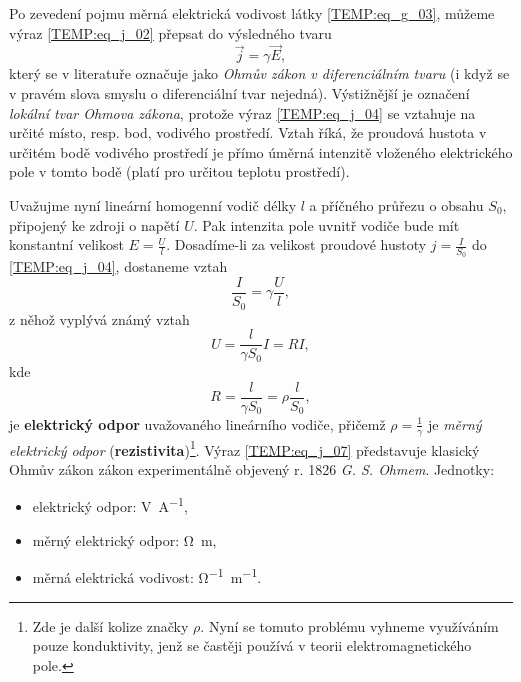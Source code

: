       Po zevedení pojmu měrná elektrická vodivost látky \ref{TEMP:eq_g_03}, můžeme výraz
      \ref{TEMP:eq_j_02} přepsat do výsledného tvaru
      \begin{equation}\label{TEMP:eq_j_04}
        \vec{j} = \gamma\vec{E},
      \end{equation}              
      který se v literatuře označuje jako \emph{Ohmův zákon v diferenciálním tvaru} (i když se v
      pravém slova smyslu o diferenciální tvar nejedná). Výstižnější je označení \emph{lokální tvar
      Ohmova zákona}, protože výraz \ref{TEMP:eq_j_04} se vztahuje na určité místo, resp. bod,
      vodivého prostředí. Vztah říká, že proudová hustota v určitém bodě vodivého prostředí je
      přímo úměrná intenzitě vloženého elektrického pole v tomto bodě (platí pro určitou teplotu
      prostředí).
      
      Uvažujme nyní lineární homogenní vodič délky $l$ a příčného průřezu o obsahu $S_0$, připojený
      ke zdroji o napětí $U$. Pak intenzita pole uvnitř vodiče bude mít konstantní velikost
      $E=\frac{U}{l}$. Dosadíme-li za velikost proudové hustoty $j=\frac{I}{S_0}$ do
      \ref{TEMP:eq_j_04}, dostaneme vztah
      \begin{equation}\label{TEMP:eq_j_05}
        \frac{I}{S_0} = \gamma\frac{U}{l},
      \end{equation}        
      z něhož vyplývá známý vztah
      \begin{equation}\label{TEMP:eq_j_06}
        U = \frac{l}{\gamma S_0}I = RI,
      \end{equation}              
      kde
      \begin{equation}\label{TEMP:eq_j_07}
        R = \frac{l}{\gamma S_0} = \rho\frac{l}{S_0},
      \end{equation} 
      je \textbf{elektrický odpor} uvažovaného lineárního vodiče, přičemž $\rho = \frac{1}{\gamma}$
      je \emph{měrný elektrický odpor} (\textbf{rezistivita})\footnote{Zde je další kolize značky
      $\rho$. Nyní se tomuto problému vyhneme využíváním pouze konduktivity, jenž se častěji
      používá v teorii elektromagnetického pole.}. Výraz \ref{TEMP:eq_j_07} představuje klasický
      Ohmův zákon zákon experimentálně objevený r. 1826 \emph{G. S. Ohmem}. Jednotky:
      \begin{itemize}
        \item elektrický odpor: \si{V.A^{-1}},
        \item měrný elektrický odpor: \si{\ohm.m},
        \item měrná elektrická vodivost: \si{\ohm^{-1}.m^{-1}}.
      \end{itemize}
      
